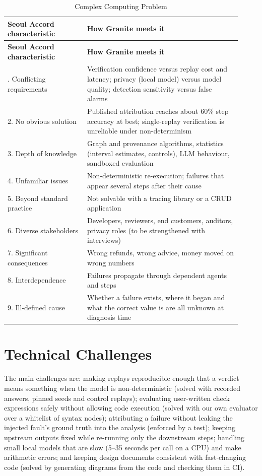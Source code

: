 \documentclass{fast-nuces-bs}
\begin{document}
{\small
\begin{longtable}{>{\raggedright\arraybackslash\hspace{0pt}}p{0.312\linewidth}>{\raggedright\arraybackslash\hspace{0pt}}p{0.608\linewidth}}
\caption{Complex Computing Problem}\label{tab:chapter2_research-2}\\
\toprule
\textbf{Seoul Accord characteristic~\cite{seoulaccord}} & \textbf{How Granite meets it} \\
\midrule
\endfirsthead
\toprule
\textbf{Seoul Accord characteristic~\cite{seoulaccord}} & \textbf{How Granite meets it} \\
\midrule
\endhead
\bottomrule
\endlastfoot
1. Conflicting requirements & Verification confidence versus replay cost and latency; privacy (local model) versus model quality; detection sensitivity versus false alarms \\
2. No obvious solution & Published attribution reaches about 60\% step accuracy at best; single-replay verification is unreliable under non-determinism \\
3. Depth of knowledge & Graph and provenance algorithms, statistics (interval estimates, controls), LLM behaviour, sandboxed evaluation \\
4. Unfamiliar issues & Non-deterministic re-execution; failures that appear several steps after their cause \\
5. Beyond standard practice & Not solvable with a tracing library or a CRUD application \\
6. Diverse stakeholders & Developers, reviewers, end customers, auditors, privacy roles (to be strengthened with interviews) \\
7. Significant consequences & Wrong refunds, wrong advice, money moved on wrong numbers \\
8. Interdependence & Failures propagate through dependent agents and steps \\
9. Ill-defined cause & Whether a failure exists, where it began and what the correct value is are all unknown at diagnosis time \\
\end{longtable}
}

\section{Technical Challenges}

The main challenges are: making replays reproducible enough that a verdict means something when the model is non-deterministic (solved with recorded answers, pinned seeds and control replays); evaluating user-written check expressions safely without allowing code execution (solved with our own evaluator over a whitelist of syntax nodes); attributing a failure without leaking the injected fault's ground truth into the analysis (enforced by a test); keeping upstream outputs fixed while re-running only the downstream steps; handling small local models that are slow (5--35 seconds per call on a CPU) and make arithmetic errors; and keeping design documents consistent with fast-changing code (solved by generating diagrams from the code and checking them in CI).
\end{document}
